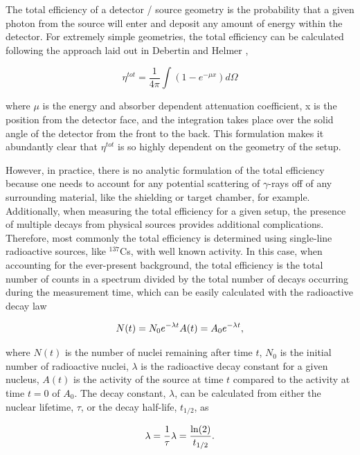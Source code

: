 The total efficiency of a detector / source geometry is the probability that a given photon from the source will enter and deposit any amount of energy within the detector. For extremely simple geometries, the total efficiency can be calculated following the approach laid out in Debertin and Helmer \cite{DebertinHelmerBook},

\begin{equation}
\eta^{tot} = \dfrac{1}{4\pi} \int \left(1 - e^{-\mu x} \right) d\Omega
\end{equation}

\noindent where $\mu$ is the energy and absorber dependent attenuation coefficient, x is the position from the detector face, and the integration takes place over the solid angle of the detector from the front to the back. This formulation makes it abundantly clear that $\eta^{tot}$ is so highly dependent on the geometry of the setup. 

However, in practice, there is no analytic formulation of the total efficiency because one needs to account for any potential scattering of $\gamma$-rays off of any surrounding material, like the shielding or target chamber, for example. Additionally, when measuring the total efficiency for a given setup, the presence of multiple decays from physical sources provides additional complications. Therefore, most commonly the total efficiency is determined using single-line radioactive sources, like $^{137}$Cs, with well known activity. In this case, when accounting for the ever-present background, the total efficiency is the total number of counts in a spectrum divided by the total number of decays occurring during the measurement time, which can be easily calculated with the radioactive decay law

\begin{equation}
N(t) = N_{0} e^{- \lambda t} \hfill A(t) = A_{0} e^{- \lambda t},
\end{equation}

\noindent where $N(t)$ is the number of nuclei remaining after time $t$, $N_{0}$ is the initial number of radioactive nuclei, $\lambda$ is the radioactive decay constant for a given nucleus, $A(t)$ is the activity of the source at time $t$ compared to the activity at time $t=0$ of $A_{0}$. The decay constant, $\lambda$, can be calculated from either the nuclear lifetime, $\tau$, or the decay half-life, $t_{1/2}$, as

\begin{equation}
\lambda = \dfrac{1}{\tau} \hfill \lambda = \dfrac{\text{ln}(2)}{t_{1/2}}.
\end{equation}

